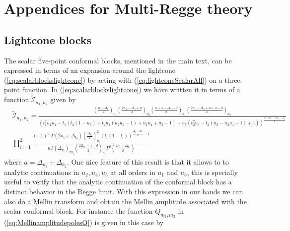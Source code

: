 
\chapter{Appendices for Multi-Regge theory} %
\label{AppendixMultiRegge}
\section{Lightcone blocks}\label{app:Blocks}
The scalar five-point conformal blocks, mentioned in the main text, can be expressed in terms of an expansion around the lightcone (\ref{eq:scalarblockslightcone})  by acting with (\ref{eq:lightconeScalarAll}) on a three-point function. In (\ref{eq:scalarblockslightcone})  we have written it in terms of a function $\tilde{\mathcal{I}}_{n_1,n_2}$ given by
\begin{align}
   & \tilde{\mathcal{I}}_{n_1,n_2}=\tfrac{\left(\frac{a-\Delta_5}{2}\right)_{n_1}\left(\frac{2 n_1-\Delta_5+a}{2} \right)_{n_2} \left(\frac{a+4-\Delta_5-d}{2} \right)_{n_1} \left(\frac{2 n_1-\Delta_5+a+4-d}{2} \right)_{n_2} }{  \left(t_1^2 u_1 u_4-t_1 \left(t_2 \left(1-u_5\right)+t_2 u_4 \left(u_2 u_5-1\right)+u_1 u_4+u_5-1\right)+u_5 \left(t_2^2 u_3-t_2 \left(u_3-u_2 u_4+1\right)+1\right)\right)^{\frac{a+2 n_1+2 n_2-\Delta_5}{2}} } \label{eq:blockscalarposallmi} \\
   & \prod_{i=1}^2\tfrac{(-1)^{n_i} \Gamma (2 n_i+\Delta_{k_i})  \left(\frac{\Delta_{k_i}}{2}\right)_{n_i}^2  (t_i(1-t_i))^{\frac{\Delta_{k_i}+2n_i}{2}-1}    }{n_i!(\Delta_{k_i})_{2 n_i} \left(\frac{2\Delta_{k_i}+4-d }{2}\right)_{n_i} \Gamma^2 \left(\frac{2n_i+\Delta_{k_i}}{2}\right) }\nonumber
\end{align}
where $a=\Delta_{k_1}+\Delta_{k_2}$. One nice feature of this result is that it allows to to analytic continuations in $u_2,u_4,u_5$ at all orders in $u_1$ and $u_3$, this is specially useful to verify that the analytic continuation of the conformal block has a distinct behavior in the Regge limit. With this expression in our hands we can also do a Mellin transform and obtain the Mellin amplitude associated with the scalar conformal block. For  instance the function $Q_{m_1,m_2}$ in (\ref{eq:MellinamplitudepolesQ}) is given in this case by
